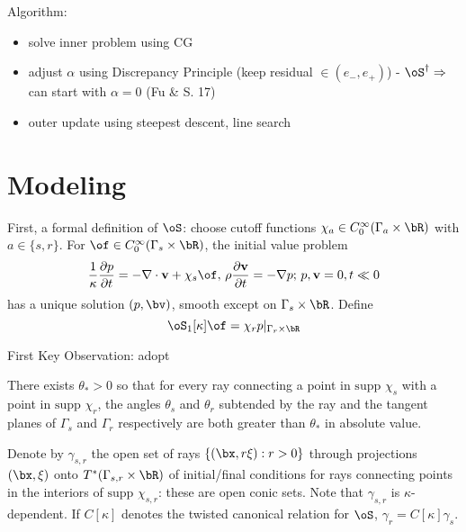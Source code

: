 Algorithm:
\begin{itemize}
\item solve inner problem using CG
\item adjust $\alpha$ using Discrepancy Principle (keep residual $\in (e_-, e_+)$) - $\oS^{\dagger} \Rightarrow$ can start with $\alpha=0$ (Fu \& S. 17)
\item outer update using steepest descent, line search
\end{itemize}



\section{Modeling}

First, a formal definition of $\oS$: choose cutoff functions $\chi_a \in C_0^{\infty}(\Gamma_a \times \bR)$ with $a \in \{s,r\}$. For $\of \in C_0^{\infty}(\Gamma_s \times \bR)$, the initial value problem
\begin{equation}
\label{eqn:awept}
\frac{1}{\kappa}\frac{\partial p}{\partial t} = -\nabla \cdot {\bf v} + \chi_s\of, \,\rho \frac{\partial {\bf v}}{\partial t} = - \nabla p; \,p,{\bf v}=0, t \ll 0
\end{equation}
has a unique solution $(p,\bv)$, smooth except on $\Gamma_s \times \bR$. 
Define
\begin{equation}
\label{eqn:os1def}
\oS_1[\kappa]\of = \chi_r p|_{\Gamma_r \times \bR}
\end{equation}

First Key Observation: adopt

 There exists $\theta_*>0$ so that for every ray connecting a point in $\mbox{supp }\chi_s$ with a point in $\mbox{supp }\chi_r$, the angles $\theta_s$ and $\theta_r$ subtended by the ray and the tangent planes of $\Gamma_s$ and $\Gamma_r$ respectively are both greater than $\theta_*$ in absolute value.

Denote by $\gamma_{s,r}$ the open set of rays $\{(\bx,r \xi): r>0\}$ through projections $(\bx,\xi)$ onto $T^*(\Gamma_{s,r} \times \bR)$ of initial/final conditions for rays connecting points in the interiors of $\mbox{supp }\chi_{s,r}$: these are open conic sets. Note that $\gamma_{s,r}$ is $\kappa$-dependent. If $C[\kappa]$ denotes the twisted canonical relation for $\oS$, $\gamma_r = C[\kappa]\gamma_s$.

